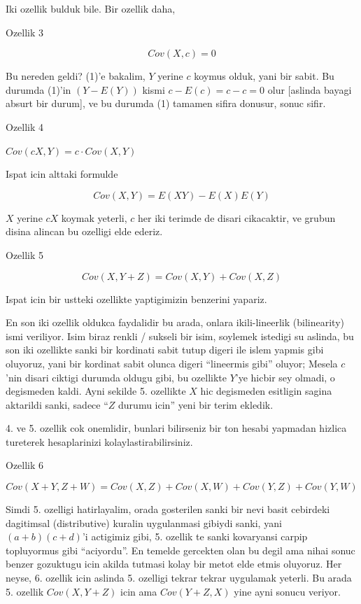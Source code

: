 \documentclass[12pt,fleqn]{article}\usepackage{../common}
\begin{document}
Iki ozellik bulduk bile. Bir ozellik daha,

Ozellik 3

$$ Cov(X,c) = 0 $$

Bu nereden geldi? (1)'e bakalim, $Y$ yerine $c$ koymus olduk, yani bir
sabit. Bu durumda (1)'in $(Y-E(Y))$ kismi $c-E(c)=c-c=0$ olur [aslinda
bayagi absurt bir durum], ve bu durumda (1) tamamen sifira donusur, sonuc sifir.

Ozellik 4

$Cov(cX,Y) = c \cdot Cov(X,Y)$ 

Ispat icin alttaki formulde

$$ Cov(X,Y) =  E(XY) - E(X)E(Y) $$

$X$ yerine $cX$ koymak yeterli, $c$ her iki terimde de disari cikacaktir,
ve grubun disina alincan bu ozelligi elde ederiz.

Ozellik 5

$$ Cov(X,Y+Z) = Cov(X,Y) + Cov(X,Z) $$

Ispat icin bir ustteki ozellikte yaptigimizin benzerini yapariz. 

En son iki ozellik oldukca faydalidir bu arada, onlara ikili-lineerlik
(bilinearity) ismi veriliyor. Isim biraz renkli / sukseli bir isim,
soylemek istedigi su aslinda, bu son iki ozellikte sanki bir kordinati
sabit tutup digeri ile islem yapmis gibi oluyoruz, yani bir kordinat sabit
olunca digeri ``lineermis gibi'' oluyor; Mesela $c$'nin disari ciktigi
durumda oldugu gibi, bu ozellikte $Y$'ye hicbir sey olmadi, o degismeden
kaldi. Ayni sekilde 5. ozellikte $X$ hic degismeden esitligin sagina
aktarildi sanki, sadece ``$Z$ durumu icin'' yeni bir terim ekledik. 

4. ve 5. ozellik cok onemlidir, bunlari bilirseniz bir ton hesabi yapmadan
hizlica tureterek hesaplarinizi kolaylastirabilirsiniz. 

Ozellik 6

$$ Cov(X+Y, Z+W) = Cov(X,Z) + Cov(X,W) + Cov(Y,Z) + Cov(Y,W) $$

Simdi 5. ozelligi hatirlayalim, orada gosterilen sanki bir nevi basit
cebirdeki dagitimsal (distributive) kuralin uygulanmasi gibiydi sanki, yani
$(a+b)(c+d)$'i actigimiz gibi, 5. ozellik te sanki kovaryansi carpip
topluyormus gibi ``aciyordu''. En temelde gercekten olan bu degil ama nihai
sonuc benzer gozuktugu icin akilda tutmasi kolay bir metot elde etmis
oluyoruz. Her neyse, 6. ozellik icin aslinda 5. ozelligi tekrar tekrar
uygulamak yeterli. Bu arada 5. ozellik $Cov(X,Y+Z)$ icin ama $Cov(Y+Z,X)$
yine ayni sonucu veriyor. 
\end{document}
